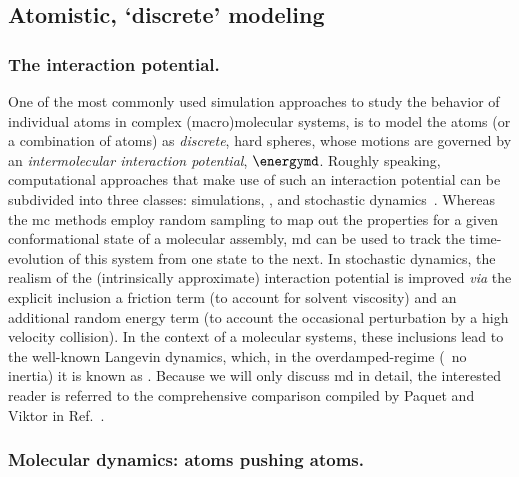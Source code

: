 \subsection{Atomistic, `discrete' modeling}
%

\subsubsection{The interaction potential.}
%

One of the most commonly used simulation approaches to study the behavior of individual atoms in complex
(macro)molecular systems, is to model the atoms (or a combination of atoms) as \emph{discrete}, hard spheres,
whose motions are governed by an \emph{intermolecular interaction potential}, $\energymd$. Roughly speaking,
computational approaches that make use of such an interaction potential can be subdivided into three classes:
 simulations, , and stochastic dynamics~\cite{Paquet-2015}. Whereas the \gls{mc}
methods employ random sampling to map out the properties for a given conformational state of a molecular
assembly, \gls{md} can be used to track the time-evolution of this system from one state to the next. In
stochastic dynamics, the realism of the (intrinsically approximate) interaction potential is improved
\textit{via} the explicit inclusion a friction term (to account for solvent viscosity) and an additional
random energy term (to account the occasional perturbation by a high velocity collision). In the context of a
molecular systems, these inclusions lead to the well-known Langevin dynamics, which, in the overdamped-regime
(\ie~no inertia) it is known as . Because we will only discuss \gls{md} in detail, the interested
reader is referred to the comprehensive comparison compiled by Paquet and Viktor in Ref.~\cite{Paquet-2015}.

\subsubsection{Molecular dynamics: atoms pushing atoms.}
%


